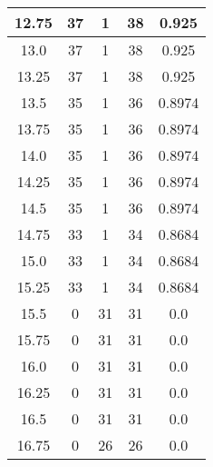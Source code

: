 \documentclass[letterpaper, 12pt]{article}
\begin{document}
\begin{longtable}{|c|c|c|c|c|}
\hline
12.75 & 37 & 1 & 38 & 0.925 \\
\hline
13.0 & 37 & 1 & 38 & 0.925 \\
\hline
13.25 & 37 & 1 & 38 & 0.925 \\
\hline
13.5 & 35 & 1 & 36 & 0.8974 \\
\hline
13.75 & 35 & 1 & 36 & 0.8974 \\
\hline
14.0 & 35 & 1 & 36 & 0.8974 \\
\hline
14.25 & 35 & 1 & 36 & 0.8974 \\
\hline
14.5 & 35 & 1 & 36 & 0.8974 \\
\hline
14.75 & 33 & 1 & 34 & 0.8684 \\
\hline
15.0 & 33 & 1 & 34 & 0.8684 \\
\hline
15.25 & 33 & 1 & 34 & 0.8684 \\
\hline
15.5 & 0 & 31 & 31 & 0.0 \\
\hline
15.75 & 0 & 31 & 31 & 0.0 \\
\hline
16.0 & 0 & 31 & 31 & 0.0 \\
\hline
16.25 & 0 & 31 & 31 & 0.0 \\
\hline
16.5 & 0 & 31 & 31 & 0.0 \\
\hline
16.75 & 0 & 26 & 26 & 0.0 \\
\hline
\end{longtable}
\end{document}
